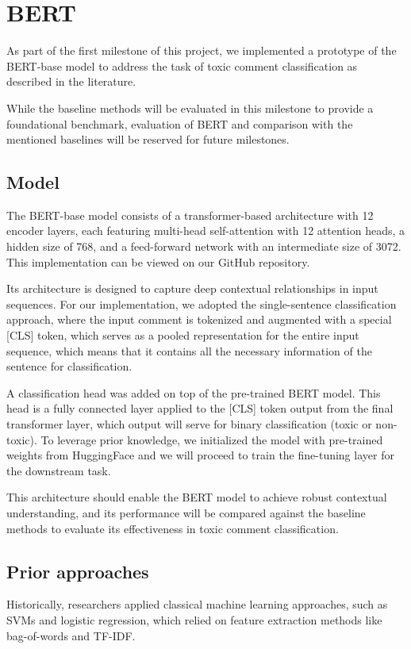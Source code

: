 \section{BERT}

As part of the first milestone of this project, we implemented a prototype of the BERT-base model to address the task of toxic comment classification as described in the literature. \cite{Devlin2019} 

While the baseline methods will be evaluated in this milestone to provide a foundational benchmark, evaluation of BERT and comparison with the mentioned baselines will be reserved for future milestones.

\subsection{Model}

The BERT-base model consists of a transformer-based architecture with 12 encoder layers, each featuring multi-head self-attention with 12 attention heads, a hidden size of 768, and a feed-forward network with an intermediate size of 3072. This implementation can be viewed on our GitHub repository. \cite{Queisler2024} 

Its architecture is designed to capture deep contextual relationships in input sequences. For our implementation, we adopted the single-sentence classification approach, where the input comment is tokenized and augmented with a special [CLS] token, which serves as a pooled representation for the entire input sequence, which means that it contains all the necessary information of the sentence for classification. \cite{Devlin2019}

A classification head was added on top of the pre-trained BERT model. This head is a fully connected layer applied to the [CLS] token output from the final transformer layer, which output will serve for binary classification (toxic or non-toxic). To leverage prior knowledge, we initialized the model with pre-trained weights from HuggingFace and we will proceed to train the fine-tuning layer for the downstream task.

This architecture should enable the BERT model to achieve robust contextual understanding, and its performance will be compared against the baseline methods to evaluate its effectiveness in toxic comment classification.

\subsection{Prior approaches}
Historically, researchers applied classical machine learning approaches, such as SVMs and logistic regression, which relied on feature extraction methods like bag-of-words and TF-IDF. \cite{Ozoh2019, Chakrabarty2020}

